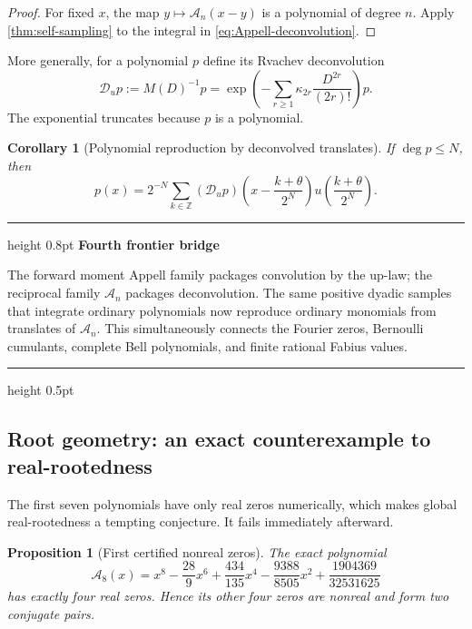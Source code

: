 \documentclass[11pt]{article}
\numberwithin{equation}{section}
\newtheorem{proposition}[theorem]{Proposition}
\newtheorem{corollary}[theorem]{Corollary}
\theoremstyle{definition}
\theoremstyle{remark}
\newenvironment{resultbox}[1][]
{\begin{center}\begin{minipage}{0.94\textwidth}%
\color{navy}\hrule height 0.8pt\vspace{0.45em}%
\color{black}\textbf{#1}\par\smallskip}
{\vspace{0.35em}\color{navy}\hrule height 0.5pt\end{minipage}\end{center}}
\newcommand{\Z}{\mathbb Z}
\newcommand{\Acal}{\mathscr A}
\begin{document}
\begin{proof}
For fixed $x$, the map $y\mapsto\Acal_n(x-y)$ is a polynomial of degree $n$.  Apply \cref{thm:self-sampling} to the integral in \eqref{eq:Appell-deconvolution}.
\end{proof}

More generally, for a polynomial $p$ define its Rvachev deconvolution
\begin{equation}
 \mathscr D_up
 :=M(D)^{-1}p
 =\exp\!\left(-\sum_{r\ge1}\kappa_{2r}
 \frac{D^{2r}}{(2r)!}\right)p.
 \label{eq:polynomial-deconvolution}
\end{equation}
The exponential truncates because $p$ is a polynomial.

\begin{corollary}[Polynomial reproduction by deconvolved translates]
\label{cor:polynomial-deconvolution}
If $\deg p\le N$, then
\begin{equation}
 p(x)=2^{-N}\sum_{k\in\Z}
 (\mathscr D_up)\!\left(x-\frac{k+\theta}{2^N}\right)
 u\!\left(\frac{k+\theta}{2^N}\right).
 \label{eq:general-deconvolution-reproduction}
\end{equation}
\end{corollary}

\begin{resultbox}[Fourth frontier bridge]
The forward moment Appell family packages convolution by the up-law; the reciprocal family $\Acal_n$ packages deconvolution.  The same positive dyadic samples that integrate ordinary polynomials now reproduce ordinary monomials from translates of $\Acal_n$.  This simultaneously connects the Fourier zeros, Bernoulli cumulants, complete Bell polynomials, and finite rational Fabius values.
\end{resultbox}

\subsection{Root geometry: an exact counterexample to real-rootedness}

The first seven polynomials have only real zeros numerically, which makes global real-rootedness a tempting conjecture.  It fails immediately afterward.

\begin{proposition}[First certified nonreal zeros]
\label{prop:A8-roots}
The exact polynomial
\begin{equation}
 \Acal_8(x)
 =x^8-\frac{28}{9}x^6+\frac{434}{135}x^4
 -\frac{9388}{8505}x^2+\frac{1904369}{32531625}
 \label{eq:A8}
\end{equation}
has exactly four real zeros.  Hence its other four zeros are nonreal and form two conjugate pairs.
\end{proposition}
\end{document}
